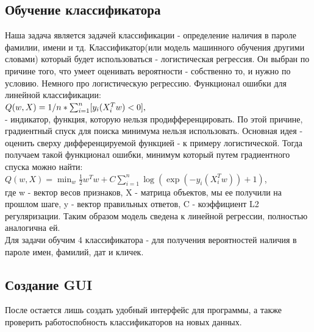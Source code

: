 \documentclass[a4paper,12pt]{article}
\begin{document}
\subsection{Обучение классификатора}
Наша задача является задачей классификации - определение наличия в пароле фамилии, имени и тд. 
Классификатор(или модель машинного обучения другими словами) который будет использоваться - логистическая регрессия. Он выбран по причине того, что умеет оценивать вероятности - собственно то, и нужно по условию. Немного про логистическую регрессию.
Функционал ошибки для линейной классификации:\\
$Q(w,X)=1/n*\sum_{i=1}^n \- [y_i (X_i^T w)<0] ,$\\ \text{[]} - индикатор, функция, которую нельзя продифференцировать. По этой причине, градиентный спуск для поиска минимума нельзя использовать. Основная идея - оценить сверху дифференцируемой функцией - к примеру логистической. Тогда получаем такой функционал ошибки, минимум который  путем градиентного спуска можно найти:  \\
$Q(w,X) = \min_{w} \frac{1}{2}w^T w + C \sum_{i=1}^n \log(\exp(- y_i (X_i^T w)) + 1) $,\\ где w - вектор весов признаков, X - матрица объектов, мы ее получили на прошлом шаге, y - вектор правильных ответов, C - коэффициент L2 регуляризации. Таким образом модель сведена к линейной регрессии, полностью аналогична ей.\\
Для задачи обучим 4 классификатора - для получения вероятностей наличия в пароле имен, фамилий, дат и кличек.
\subsection{Создание GUI}
После остается лишь создать удобный интерфейс для программы, а также проверить работоспобность классификаторов на новых данных.
\newpage
\end{document}

